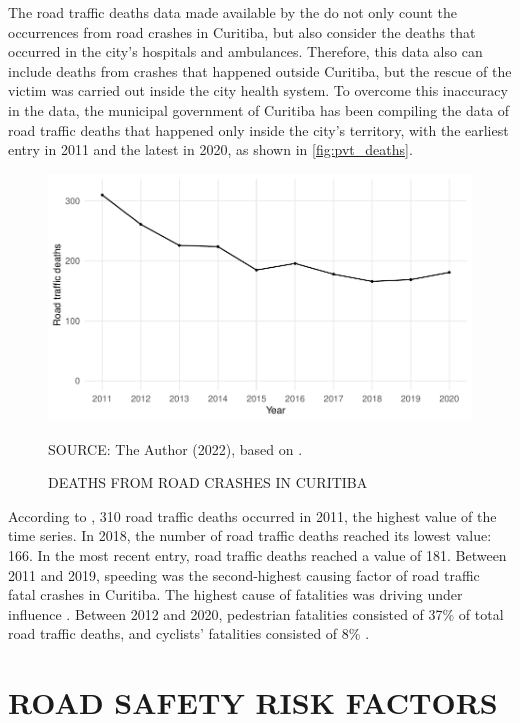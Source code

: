 The road traffic deaths data made available by the \textcite{MinistryofHealth2022} do not only count the occurrences from road crashes in Curitiba, but also consider the deaths that occurred in the city's hospitals and ambulances. Therefore, this data also can include deaths from crashes that happened outside Curitiba, but the rescue of the victim was carried out inside the city health system. To overcome this inaccuracy in the data, the municipal government of Curitiba has been compiling the data of road traffic deaths that happened only inside the city's territory, with the earliest entry in 2011 and the latest in 2020, as shown in \autoref{fig:pvt_deaths}.  

\begin{figure}[!htbp]
    \centering\footnotesize
    \captionsetup{font=footnotesize}
    \caption{DEATHS FROM ROAD CRASHES IN CURITIBA}
    \includegraphics{fig/pvt_plot.pdf}
    \label{fig:pvt_deaths}
    \par SOURCE: The Author (2022), based on \textcite{Curitiba2021}.
\end{figure} 

According to \textcite{Curitiba2021}, 310 road traffic deaths occurred in 2011, the highest value of the time series. In 2018, the number of road traffic deaths reached its lowest value: 166. In the most recent entry, road traffic deaths reached a value of 181. Between 2011 and 2019, speeding was the second-highest causing factor of road traffic fatal crashes in Curitiba. The highest cause of fatalities was driving under influence \cite{Curitiba2020}. Between 2012 and 2020, pedestrian fatalities consisted of 37\% of total road traffic deaths, and cyclists' fatalities consisted of 8\% \cite{Curitiba2021}.

\section{ROAD SAFETY RISK FACTORS} \label{sec:risk}

